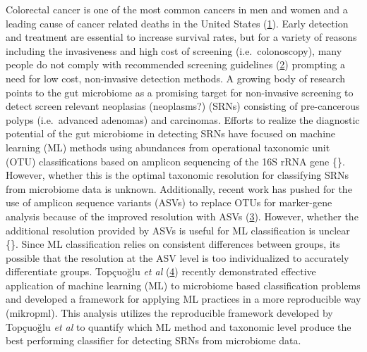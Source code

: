 \documentclass[
]{article}
\begin{document}
Colorectal cancer is one of the most common cancers in men and women and
a leading cause of cancer related deaths in the United States
(\protect\hyperlink{ref-siegel2020}{1}). Early detection and treatment
are essential to increase survival rates, but for a variety of reasons
including the invasiveness and high cost of screening
(i.e.~colonoscopy), many people do not comply with recommended screening
guidelines (\protect\hyperlink{ref-garcuxeda2011a}{2}) prompting a need
for low cost, non-invasive detection methods. A growing body of research
points to the gut microbiome as a promising target for non-invasive
screening to detect screen relevant neoplasias (neoplasms?) (SRNs)
consisting of pre-cancerous polyps (i.e.~advanced adenomas) and
carcinomas. Efforts to realize the diagnostic potential of the gut
microbiome in detecting SRNs have focused on machine learning (ML)
methods using abundances from operational taxonomic unit (OTU)
classifications based on amplicon sequencing of the 16S rRNA gene \{\}.
However, whether this is the optimal taxonomic resolution for
classifying SRNs from microbiome data is unknown. Additionally, recent
work has pushed for the use of amplicon sequence variants (ASVs) to
replace OTUs for marker-gene analysis because of the improved resolution
with ASVs (\protect\hyperlink{ref-callahan2017}{3}). However, whether
the additional resolution provided by ASVs is useful for ML
classification is unclear \{\}. Since ML classification relies on
consistent differences between groups, its possible that the resolution
at the ASV level is too individualized to accurately differentiate
groups. Topçuoğlu \emph{et al}
(\protect\hyperlink{ref-topuxe7uolu2020}{4}) recently demonstrated
effective application of machine learning (ML) to microbiome based
classification problems and developed a framework for applying ML
practices in a more reproducible way (mikropml). This analysis utilizes
the reproducible framework developed by Topçuoğlu \emph{et al} to
quantify which ML method and taxonomic level produce the best performing
classifier for detecting SRNs from microbiome data.
\end{document}
